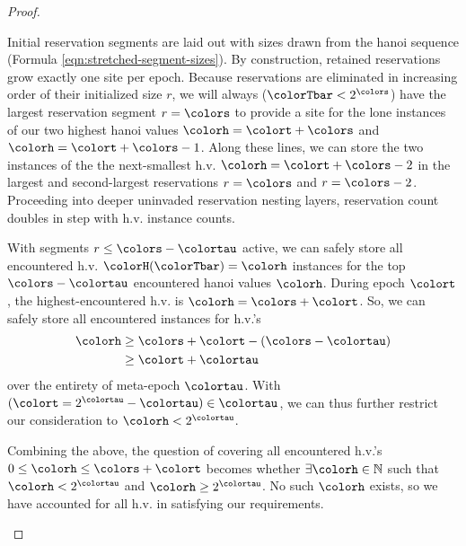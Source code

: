 \begin{proof}
\begin{proofpart}
Initial reservation segments are laid out with sizes drawn from the hanoi sequence (Formula \ref{eqn:stretched-segment-sizes}).
By construction, retained reservations grow exactly one site per epoch.
Because reservations are eliminated in increasing order of their initialized size $r$, we will always ($\colorTbar < 2^{\colors}$) have the largest reservation segment $r=\colors$ to provide a site for the lone instances of our two highest hanoi values $\colorh=\colort+\colors$ and $\colorh=\colort+\colors-1$.
Along these lines, we can store the two instances of the the next-smallest h.v. $\colorh=\colort+\colors-2$ in the largest and second-largest reservations $r=\colors$ and $r=\colors-2$.
Proceeding into deeper uninvaded reservation nesting layers, reservation count doubles in step with h.v. instance counts.

With segments $r \leq \colors - \colortau$ active, we can safely store all encountered h.v. $\colorH(\colorTbar) = \colorh$ instances for the top $\colors - \colortau$ encountered hanoi values $\colorh$.
During epoch $\colort$, the highest-encountered h.v. is $\colorh=\colors + \colort$.
So, we can safely store all encountered instances for h.v.'s
\begin{align*}
\colorh
&\geq
\colors + \colort - (\colors - \colortau)\\
&\geq
\colort + \colortau
\end{align*}
over the entirety of meta-epoch $\colortau$.
With $(\colort = 2^{\colortau} - \colortau) \in \colortau$, we can thus further restrict our consideration to $\colorh < 2^{\colortau}$.
\end{proofpart}

\begin{proofpart}
Combining the above, the question of covering all encountered h.v.'s $0\leq\colorh\leq\colors+\colort$ becomes whether $\exists \colorh \in \mathbb{N}$ such that $\colorh < 2^{\colortau}$ and $\colorh \geq 2^{\colortau}$.
No such $\colorh$ exists, so we have accounted for all h.v. in satisfying our requirements.
\end{proofpart}

\end{proof}
